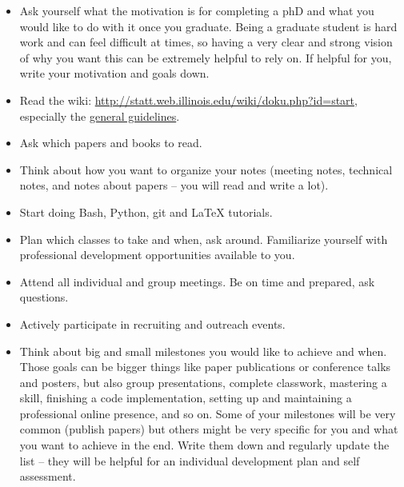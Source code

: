 \documentclass{article}
\begin{document}
\begin{itemize}
	\item  Ask yourself what the motivation is for completing a phD and what you would like to do with it once you graduate. Being a graduate student is hard work and can feel difficult at times, so having a very clear and strong vision of why you want this can be extremely helpful to rely on. If helpful for you, write your motivation and goals down.
	\item Read the wiki: \href{http://statt.web.illinois.edu/wiki/doku.php?id=start}{http://statt.web.illinois.edu/wiki/doku.php?id=start}, especially the \href{http://statt.web.illinois.edu/wiki/doku.php?id=guidelines:general}{general guidelines}.
	\item Ask which papers and books to read.
	\item Think about how you want to organize your notes (meeting notes, technical notes, and notes about papers -- you will read and write a lot).
	\item Start doing Bash, Python, git and LaTeX tutorials.
	\item Plan which classes to take and when, ask around. Familiarize yourself with professional development opportunities available to you.
	\item Attend all individual and group meetings. Be on time and prepared, ask questions. 
	\item Actively participate in recruiting and outreach events. 
	\item Think about big and small milestones you would like to achieve and when. Those goals can be bigger things like paper publications or conference talks and posters,  but also group presentations, complete classwork, mastering a skill, finishing a code implementation, setting up and maintaining a professional online presence, and so on.  Some of your milestones will be very common (publish papers) but others might be very specific for you and what you want to achieve in the end. Write them down and regularly update the list -- they will be helpful for an individual development plan and self assessment.
\end{itemize}
\end{document}
